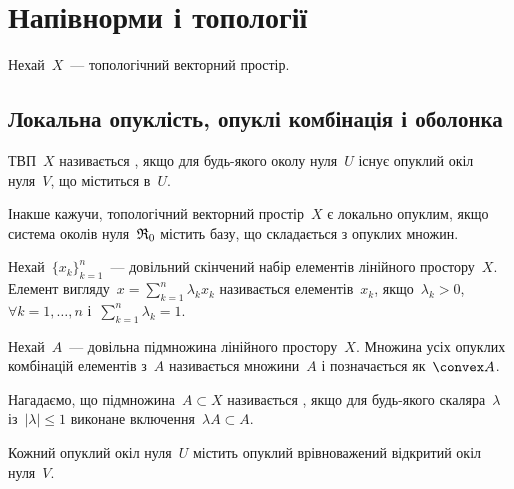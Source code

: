 \chapter{Напівнорми і топології}

Нехай~$X$~--- топологічний векторний простір.

\section{Локальна опуклість, опуклі комбінація і оболонка}

\begin{definition}
    ТВП~$X$ називається , якщо для будь-якого околу нуля~$U$ існує опуклий окіл нуля~$V$, що міститься в~$U$.
\end{definition}

\begin{remark}
    Інакше кажучи, топологічний векторний простір~$X$ є локально опуклим, якщо система околів нуля~$\frak R_0$ містить базу, що складається з опуклих множин.
\end{remark}

\begin{definition}
    Нехай~$\{x_k\}_{k = 1}^n$~--- довільний скінчений набір елементів лінійного простору~$X$. Елемент вигляду~$x = \sum_{k = 1}^n \lambda_k x_k$ називається  елементів~$x_k$, якщо~$\lambda_k > 0$,~$\forall k = 1, \dots, n$ і~$\sum_{k = 1}^n \lambda_k = 1$.
\end{definition}

\begin{definition}
    Нехай~$A$~--- довільна підмножина лінійного простору~$X$. Множина усіх опуклих комбінацій елементів з~$A$ називається  множини~$A$ і позначається як~$\convex A$.
\end{definition}

\begin{definition}
    Нагадаємо, що підмножина~$A \subset X$ називається , якщо для будь-якого скаляра~$\lambda$ із~$|\lambda| \le 1$ виконане включення~$\lambda A \subset A$.
\end{definition}

\begin{theorem}
    Кожний опуклий окіл нуля~$U$ містить опуклий врівноважений відкритий окіл нуля~$V$.
\end{theorem}


